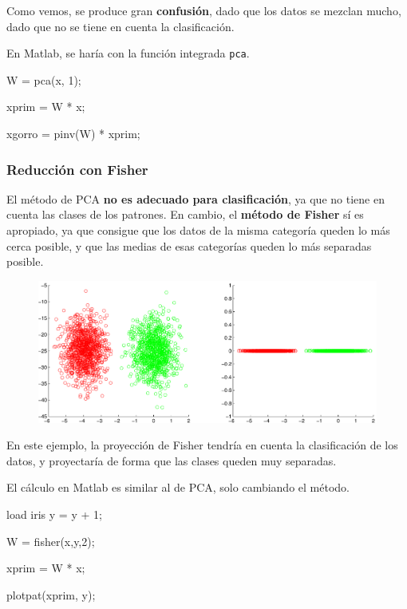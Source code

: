 \documentclass[11pt]{scrartcl}
\begin{document}
Como vemos, se produce gran \textbf{confusión}, dado que los datos se mezclan
mucho, dado que no se tiene en cuenta la clasificación.

En Matlab, se haría con la función integrada \texttt{pca}.

\begin{matlabcode}
W = pca(x, 1);

xprim = W * x;

xgorro = pinv(W) * xprim;
\end{matlabcode}

\subsubsection{Reducción con Fisher}

El método de PCA \textbf{no es adecuado para clasificación}, ya que no tiene en
cuenta las clases de los patrones. En cambio, el \textbf{método de Fisher} sí es
apropiado, ya que consigue que los datos de la misma categoría queden lo más
cerca posible, y que las medias de esas categorías queden lo más separadas
posible.

\begin{figure}[h!]
  \centering
  \includegraphics[width=\textwidth]{img/fisher_1}
\end{figure}

En este ejemplo, la proyección de Fisher tendría en cuenta la clasificación de
los datos, y proyectaría de forma que las clases queden muy separadas.

El cálculo en Matlab es similar al de PCA, solo cambiando el método.

\begin{matlabcode}
load iris
y = y + 1;

W = fisher(x,y,2);

xprim = W * x;

plotpat(xprim, y);
\end{matlabcode}
\end{document}
